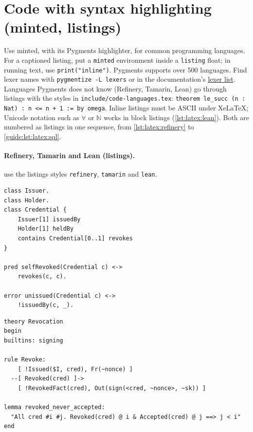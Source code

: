 \section{Code with syntax highlighting (minted, listings)}\label{guide:latex:code}
Use minted, with its Pygments highlighter, for common programming languages.
For a captioned listing, put a \texttt{minted} environment inside a \texttt{listing} float; in running text, use \texttt{print("inline")}.
Pygments supports over 500 languages. Find lexer names with \texttt{pygmentize -L lexers} or in the documentation's \href{https://pygments.org/docs/lexers/}{lexer list}.
Languages Pygments does not know (Refinery, Tamarin, Lean) go through listings with the styles in \texttt{include/code-languages.tex}: \lstinline[style=lean]{theorem le_succ (n : Nat) : n <= n + 1 := by omega}.
Inline listings must be ASCII under XeLaTeX; Unicode notation such as $\forall$ or $\mathbb{N}$ works in block listings (\cref{lst:latex:lean}).
Both are numbered as listings in one sequence, from \cref{lst:latex:refinery} to \cref{guide:lst:latex:sql}.

\paragraph{Refinery, Tamarin and Lean (listings).}
 use the listings styles \texttt{refinery}, \texttt{tamarin} and \texttt{lean}.
\begin{lstlisting}[style=refinery, float=tbp, morekeywords={[2]Credential,Issuer,Holder}, caption={Refinery: a credential metamodel with an error predicate.}, label={lst:latex:refinery}]
class Issuer.
class Holder.
class Credential {
    Issuer[1] issuedBy
    Holder[1] heldBy
    contains Credential[0..1] revokes
}

pred selfRevoked(Credential c) <->
    revokes(c, c).

error unissued(Credential c) <->
    !issuedBy(c, _).
\end{lstlisting}

\begin{lstlisting}[style=tamarin, float=tbp, caption={Tamarin: revocation as a multiset-rewriting rule and a lemma.}, label={lst:latex:tamarin}]
theory Revocation
begin
builtins: signing

rule Revoke:
    [ !Issued($I, cred), Fr(~nonce) ]
  --[ Revoked(cred) ]->
    [ !RevokedFact(cred), Out(sign(<cred, ~nonce>, ~sk)) ]

lemma revoked_never_accepted:
  "All cred #i #j. Revoked(cred) @ i & Accepted(cred) @ j ==> j < i"
end
\end{lstlisting}

